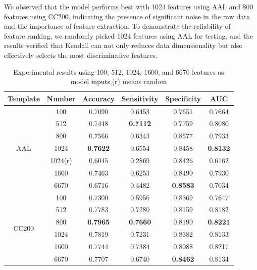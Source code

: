 \documentclass[journal,twoside,web]{ieeecolor}
\begin{document}
We observed that the model performs best with 1024 features using AAL and 800 features using CC200, indicating the presence of significant noise in the raw data and the importance of feature extraction. To demonstrate the reliability of feature ranking, we randomly picked 1024 features using AAL for testing, and the results verified that Kendall can not only reduces data dimensionality but also effectively selects the most discriminative features.
\begin{table}
	\centering
	\caption{Experimental results using 100, 512, 1024, 1600, and 6670 features as model inputs,(r) means random}
	\label{Table2}
	\tabcolsep=1cm
	\begin{tabular*}{\textwidth}{cccccc}
		\toprule
		\multicolumn{1}{l}{\textbf{Template}} & \textbf{Number} & \textbf{Accuracy}  & \textbf{Sensitivity}  & \textbf{Specificity}  & \textbf{AUC}      \\ 
		\midrule
		\multirow{7}{*}{AAL}                  & 100             & 0.7090             & 0.6453                & 0.7651                & 0.7664            \\
		& 512             & 0.7448             & \textbf{0.7112}       & 0.7759                & 0.8080            \\
		& 800             & 0.7566             & 0.6343                & 0.8577                & 0.7933            \\
		& 1024            & \textbf{0.7622}    & 0.6554                & 0.8458                & \textbf{0.8132}   \\
		& 1024(r)         & 0.6045             & 0.2869                & 0.8426                & 0.6162            \\
		& 1600            & 0.7463             & 0.6253                & 0.8490                & 0.7930            \\
		& 6670            & 0.6716             & 0.4482                & \textbf{0.8583}       & 0.7034            \\ 
		\midrule
		\multirow{6}{*}{CC200}                & 100             & 0.7300             & 0.5956                & 0.8369                & 0.7647            \\
		& 512             & 0.7783             & 0.7280                & 0.8159                & 0.8182            \\
		& 800             & \textbf{0.7965}    & \textbf{0.7660}       & 0.8190                & \textbf{0.8221}   \\
		& 1024            & 0.7819             & 0.7231                & 0.8382                & 0.8133            \\
		& 1600            & 0.7744             & 0.7384                & 0.8088                & 0.8217            \\
		& 6670            & 0.7707             & 0.6740                & \textbf{0.8462}       & 0.8134            \\
		\bottomrule
	\end{tabular*}
\end{table}
\end{document}

